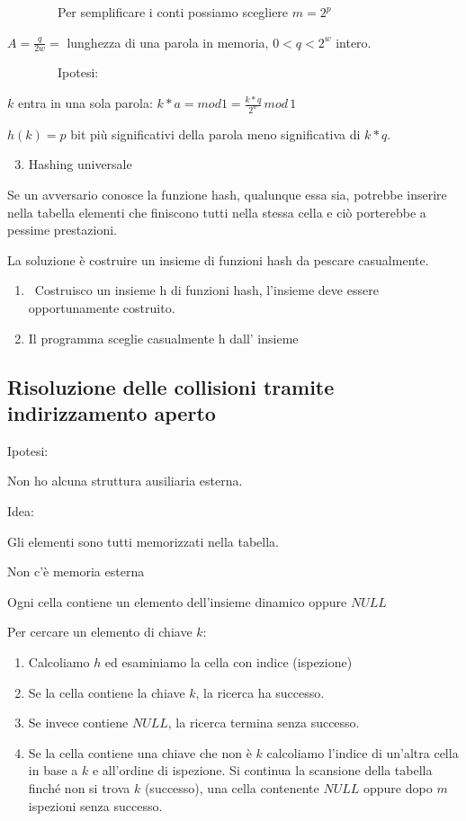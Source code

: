 \documentclass[tikz]{article}
\providecommand{\tightlist}{%
  \setlength{\itemsep}{0pt}\setlength{\parskip}{0pt}}
\begin{document}
{~~~~~~~~Per semplificare i conti possiamo scegliere $m=2^p$}

{$A = \frac{q}{2w} = $ lunghezza di una parola in memoria, $0<q<2^w$ intero.}

{~~~~~~~~Ipotesi:}

{$k$ entra in una sola parola: $k*a = mod 1 = \frac{k*q}{2^w}\,mod\,1$}

{$h(k)=p$ bit più significativi della parola meno significativa di $k*q$.}

\begin{enumerate}
\setcounter{enumi}{2}
\tightlist
\item
  {Hashing universale}
\end{enumerate}

{Se un avversario conosce la funzione hash, qualunque essa sia, potrebbe inserire nella tabella elementi che finiscono tutti nella stessa cella e ciò porterebbe a pessime prestazioni.}

{La soluzione è costruire un insieme di funzioni hash da pescare casualmente.}

\begin{enumerate}
\tightlist
\item
  {~Costruisco un insieme h di funzioni hash, l'insieme deve essere
  opportunamente costruito.}
\item
  {Il programma sceglie casualmente h dall' insieme}
\end{enumerate}

\subsection{Risoluzione delle collisioni tramite indirizzamento aperto}

{Ipotesi: }

{Non ho alcuna struttura ausiliaria esterna.}

{Idea:}

{Gli elementi sono tutti memorizzati nella tabella.}

{Non c'è memoria esterna}

{Ogni cella contiene un elemento dell'insieme dinamico oppure $NULL$}

{Per cercare un elemento di chiave $k$:}

\begin{enumerate}
\tightlist
\item
  {Calcoliamo $h$ ed esaminiamo la cella con indice (ispezione)}
\item
  {Se la cella contiene la chiave $k$, la ricerca ha successo. }
\item
  {Se invece contiene $NULL$, la ricerca termina senza successo.}
\item
  {Se la cella contiene una chiave che non è $k$ calcoliamo l'indice di un'altra cella in base a $k$ e all'ordine di ispezione. Si continua la scansione della tabella finché non si trova $k$ (successo), una cella contenente $NULL$ oppure dopo $m$ ispezioni senza successo.}
\end{enumerate}
\end{document}
